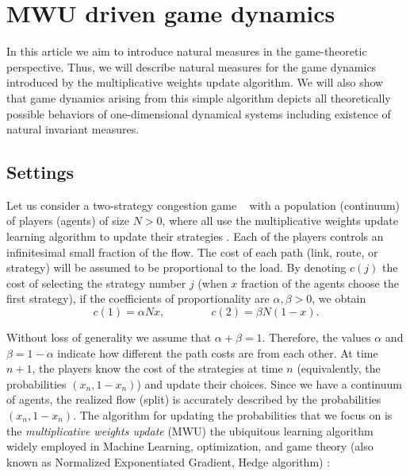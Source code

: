 \documentclass[format=acmsmall, authorversion, screen=true]{acmart}
\begin{document}
\section{MWU driven game dynamics}
\label{sec:MWU}
In this article we aim to introduce natural measures in the game-theoretic perspective. Thus, we will describe natural measures for the game dynamics introduced by the multiplicative weights update algorithm. We will also show that game dynamics arising from this simple algorithm depicts all theoretically possible behaviors of one-dimensional dynamical systems including existence of natural invariant measures. %

\subsection{Settings}
Let us consider a two-strategy congestion game ~\cite{rosenthal73} with a population (continuum) of players (agents) of size $N>0$, where all use the multiplicative weights update learning algorithm to update their strategies \cite{Arora05themultiplicative}. Each of the players controls an infinitesimal small fraction of the flow. The cost of each path (link, route, or strategy) will be assumed to be proportional to the load. By denoting $c(j)$ the cost of selecting the strategy number $j$ (when $x$ fraction of the agents choose the first strategy), if the coefficients of proportionality are $\alpha,\beta>0$, we obtain
\begin{equation}\label{cost}
c(1)=\alpha N x, \hspace{50pt} c(2)=\beta N (1-x).
\end{equation}

Without loss of generality we assume that $\alpha+\beta=1$. Therefore, the values $\alpha$ and $\beta=1-\alpha$  indicate how different the path costs are from each other. 
At time $n+1$, the players know the cost of the strategies at
time $n$ (equivalently, the probabilities $(x_n, 1-x_n)$) and update
their choices. Since we have a continuum of agents, 
the realized flow (split) is accurately described by the probabilities $(x_n, 1-x_n)$.
The algorithm for updating the probabilities that we focus on is the
\emph{multiplicative weights update} (MWU) the ubiquitous learning algorithm widely employed in Machine Learning, optimization, and game theory (also known as Normalized Exponentiated Gradient, Hedge algorithm) \cite{Arora05themultiplicative,auer1995gambling}:
\end{document}
